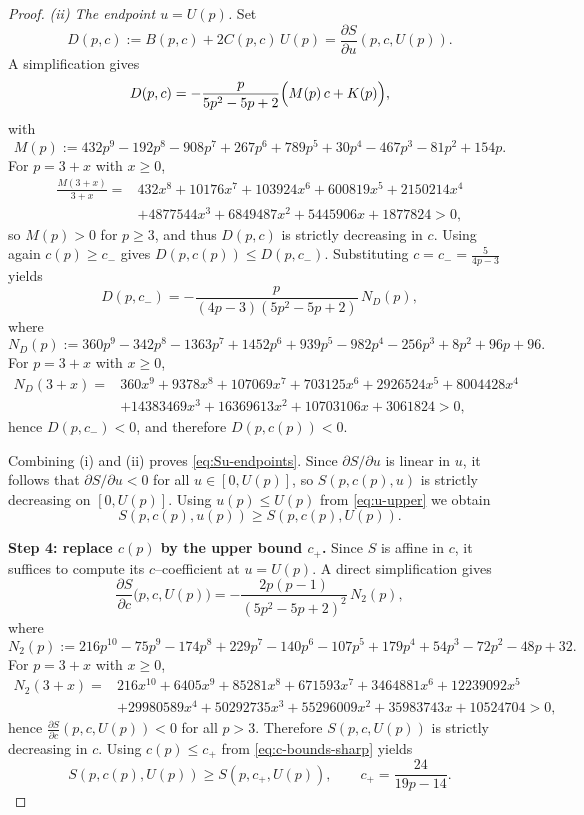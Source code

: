 \documentclass[11pt]{article}
\theoremstyle{definition}
\newcommand{\1}{\mathbf{1}}
\begin{document}
\begin{proof}
\smallskip
\emph{(ii) The endpoint $u=U(p)$.}
Set
\[
D(p,c):=B(p,c)+2C(p,c)\,U(p)=\frac{\partial S}{\partial u}(p,c,U(p)).
\]
A simplification gives
\[
D(p,c)=
-\frac{p}{5p^2-5p+2}\Bigl(M(p)\,c + K(p)\Bigr),
\]
with
\[
M(p):=432p^9-192p^8-908p^7+267p^6+789p^5+30p^4-467p^3-81p^2+154p.
\]
For $p=3+x$ with $x\ge0$,
\begin{align*}
\frac{M(3+x)}{3+x}
=&
432x^8+10176x^7+103924x^6+600819x^5+2150214x^4\\
&+4877544x^3
+6849487x^2+5445906x+1877824>0,
\end{align*}
so $M(p)>0$ for $p\ge3$, and thus $D(p,c)$ is strictly decreasing in $c$.
Using again $c(p)\ge c_-$ gives $D(p,c(p))\le D(p,c_-)$.
Substituting $c=c_-=\frac{5}{4p-3}$ yields
\[
D(p,c_-)= -\frac{p}{(4p-3)(5p^2-5p+2)}\,N_D(p),
\]
where
\[
N_D(p):=360p^9-342p^8-1363p^7+1452p^6+939p^5-982p^4-256p^3+8p^2+96p+96.
\]
For $p=3+x$ with $x\ge0$,
\begin{align*}
N_D(3+x)=&
360x^9+9378x^8+107069x^7+703125x^6+2926524x^5+8004428x^4\\&
+14383469x^3+16369613x^2+10703106x+3061824>0,
\end{align*}
hence $D(p,c_-)\!<0$, and therefore $D(p,c(p))<0$.

Combining (i) and (ii) proves \eqref{eq:Su-endpoints}. Since $\partial S/\partial u$
is linear in $u$, it follows that $\partial S/\partial u<0$ for all $u\in[0,U(p)]$,
so $S(p,c(p),u)$ is strictly decreasing on $[0,U(p)]$. Using $u(p)\le U(p)$
from \eqref{eq:u-upper} we obtain
\begin{equation}\label{eq:S-lower-by-U}
S(p,c(p),u(p))\ge S(p,c(p),U(p)).
\end{equation}

\medskip
\noindent\textbf{Step 4: replace $c(p)$ by the upper bound $c_+$.}
Since $S$ is affine in $c$, it suffices to compute its $c$--coefficient at $u=U(p)$.
A direct simplification gives
\[
\frac{\partial S}{\partial c}\bigl(p,c,U(p)\bigr)
=
-\frac{2p(p-1)}{(5p^2-5p+2)^2}\,N_2(p),
\]
where
\[
N_2(p):=216p^{10}-75p^9-174p^8+229p^7-140p^6-107p^5+179p^4+54p^3-72p^2-48p+32.
\]
For $p=3+x$ with $x\ge0$,
\begin{align*}
N_2(3+x)=&
216x^{10}+6405x^9+85281x^8+671593x^7+3464881x^6+12239092x^5\\&
+29980589x^4+50292735x^3+55296009x^2+35983743x+10524704>0,
\end{align*}
hence $\frac{\partial S}{\partial c}(p,c,U(p))<0$ for all $p>3$.
Therefore $S(p,c,U(p))$ is strictly decreasing in $c$.
Using $c(p)\le c_+$ from \eqref{eq:c-bounds-sharp} yields
\begin{equation}\label{eq:S-lower-by-cplus}
S(p,c(p),U(p))\ge S(p,c_+,U(p)),
\qquad
c_+=\frac{24}{19p-14}.
\end{equation}


\end{proof}
\end{document}
